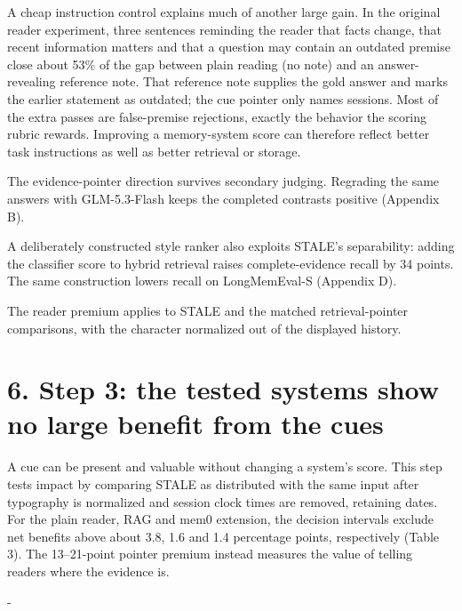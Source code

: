\documentclass[11pt]{article}
\makeatletter
\newcommand{\KeepTable}[2]{\par\penalty-100\begingroup
  \dimen@ii\pagegoal \advance\dimen@ii-\pagetotal
  \ifdim #1\baselineskip>\dimen@ii
    \ifdim \dimen@ii<0.33\textheight
      \ifdim \dimen@ii>\z@ \vfil\fi \break
    \else
      \ifdim #2\baselineskip>\dimen@ii \ifdim \dimen@ii>\z@ \vfil\fi \break\fi
    \fi
  \fi\endgroup}
\makeatother
\begin{document}
A cheap instruction control explains much of another large gain. In the original reader experiment, three sentences reminding the reader that facts change, that recent information matters and that a question may contain an outdated premise close about 53\% of the gap between plain reading (no note) and an answer-revealing reference note. That reference note supplies the gold answer and marks the earlier statement as outdated; the cue pointer only names sessions. Most of the extra passes are false-premise rejections, exactly the behavior the scoring rubric rewards. Improving a memory-system score can therefore reflect better task instructions as well as better retrieval or storage.

The evidence-pointer direction survives secondary judging. Regrading the same answers with GLM-5.3-Flash keeps the completed contrasts positive (Appendix B).

A deliberately constructed style ranker also exploits STALE's separability: adding the classifier score to hybrid retrieval raises complete-evidence recall by 34 points. The same construction lowers recall on LongMemEval-S (Appendix D).

The reader premium applies to STALE and the matched retrieval-pointer comparisons, with the character normalized out of the displayed history.

\label{main-6}

\section{6. Step 3: the tested systems show no large benefit from the cues}\label{step-3-the-tested-systems-show-no-large-benefit-from-the-cues}

A cue can be present and valuable without changing a system's score. This step tests impact by comparing STALE as distributed with the same input after typography is normalized and session clock times are removed, retaining dates. For the plain reader, RAG and mem0 extension, the decision intervals exclude net benefits above about 3.8, 1.6 and 1.4 percentage points, respectively (Table 3). The 13--21-point pointer premium instead measures the value of telling readers where the evidence is.

\KeepTable{19}{0}

\par\begingroup
\small
\end{document}
